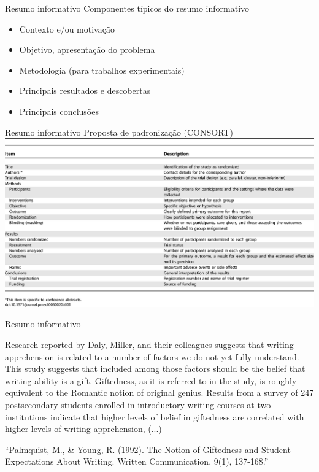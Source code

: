 \documentclass{beamer}
\begin{document}
\begin{frame}{Resumo informativo}
  Componentes típicos do resumo informativo
  \begin{itemize}
  \item Contexto e/ou motivação
  \item Objetivo, apresentação do problema
  \item Metodologia (para trabalhos experimentais)
  \item Principais resultados e descobertas
  \item Principais conclusões
  \end{itemize}
\end{frame}

\begin{frame}{Resumo informativo}
  Proposta de padronização (CONSORT)
  \includegraphics[height=0.8\textheight]{resumo_estruturado}
\end{frame}

\begin{frame}{Resumo informativo}
  \begin{example}
    Research reported by Daly, Miller, and their colleagues suggests
    that writing apprehension is related to a number of factors we do
    not yet fully understand. This study suggests that included among
    those factors should be the belief that writing ability is a
    gift. Giftedness, as it is referred to in the study, is roughly
    equivalent to the Romantic notion of original genius. Results from
    a survey of 247 postsecondary students enrolled in introductory
    writing courses at two institutions indicate that higher levels of
    belief in giftedness are correlated with higher levels of writing
    apprehension, (...) 
  \end{example}
  ``Palmquist, M., \& Young, R. (1992). The Notion of Giftedness and
  Student Expectations About Writing. Written Communication, 9(1),
  137-168.''

\end{frame}
\end{document}
